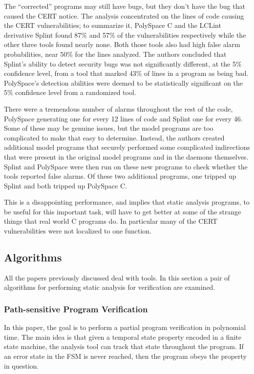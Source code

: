 \documentclass{article}
\begin{document}
\begin{multicols}{2}
The ``corrected'' programs may still have bugs, but they don't have
the bug that caused the CERT notice.  The analysis concentrated on the
lines of code causing the CERT vulnerabilities; to summarize it,
PolySpace C and the LCLint derivative Splint found 87\% and 57\% of
the vulnerabilities respectively while the other three tools found
nearly none.  Both those tools also had high false alarm
probabilities, near 50\% for the lines analyzed.  The authors
concluded that Splint's ability to detect security bugs was not
significantly different, at the 5\% confidence level, from a tool that
marked 43\% of lines in a program as being bad.  PolySpace's detection
abilities were deemed to be statistically significant on the 5\%
confidence level from a randomized tool.

There were a tremendous number of alarms throughout the rest of the
code, PolySpace generating one for every 12 lines of code and Splint
one for every 46.  Some of these may be genuine issues, but the model
programs are too complicated to make that easy to determine.  Instead,
the authors created additional model programs that securely performed
some complicated indirections that were present in the original model
programs and in the daemons themselves.  Splint and PolySpace were
then run on these new programs to check whether the tools reported
false alarms.  Of these two additional programs, one tripped up Splint
and both tripped up PolySpace C.

This is a disappointing performance, and implies that static analysis
programs, to be useful for this important task, will have to get
better at some of the strange things that real world C programs do.
In particular many of the CERT vulnerabilities were not localized to
one function.

\subsection{Algorithms}

All the papers previously discussed deal with tools.  In this section
a pair of algorithms for performing static analysis for verification
are examined.

\subsubsection{Path-sensitive Program Verification~\cite{512538}}

In this paper, the goal is to perform a partial program verification
in polynomial time.  The main idea is that given a temporal state
property encoded in a finite state machine, the analysis tool can
track that state throughout the program.  If an error state in the FSM
is never reached, then the program obeys the property in question.


\end{multicols}
\end{document}
